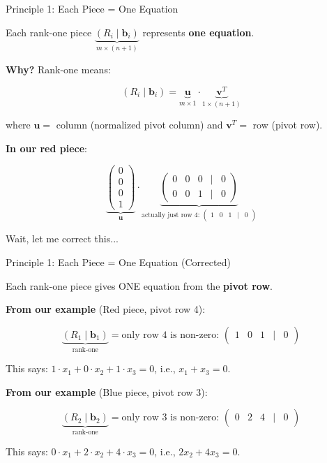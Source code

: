 \documentclass[10pt]{beamer}
\theoremstyle{definition}
\newcommand{\x}[1]{\alert{\textbf{#1}}}
\begin{document}
\begin{frame}{Principle 1: Each Piece = One Equation}

Each rank-one piece $\underbrace{(R_i \mid \mathbf{b}_i)}_{m \times (n+1)}$ represents \x{one equation}.

\vspace{1em}

\x{Why?} Rank-one means:

$$(R_i \mid \mathbf{b}_i) = \underbrace{\mathbf{u}}_{m \times 1} \cdot \underbrace{\mathbf{v}^T}_{1 \times (n+1)}$$

where $\mathbf{u} =$ column (normalized pivot column) and $\mathbf{v}^T =$ row (pivot row).

\vspace{1em}

\x{In our red piece}:

$$\underbrace{\begin{pmatrix} 0\\0\\0\\1 \end{pmatrix}}_{\mathbf{u}} \cdot \underbrace{\begin{pmatrix} 0 & 0 & 0 & \mid & 0 \\ 0 & 0 & 1 & \mid & 0 \end{pmatrix}}_{\text{actually just row 4: } \begin{pmatrix} 1 & 0 & 1 & \mid & 0 \end{pmatrix}}$$

Wait, let me correct this...

\end{frame}

\begin{frame}{Principle 1: Each Piece = One Equation (Corrected)}

Each rank-one piece gives ONE equation from the \textbf{pivot row}.

\vspace{1em}

\x{From our example} (Red piece, pivot row 4):

$$\underbrace{(R_1 \mid \mathbf{b}_1)}_{\text{rank-one}} = \text{only row 4 is non-zero: } \begin{pmatrix} 1 & 0 & 1 & \mid & 0 \end{pmatrix}$$

This says: $1 \cdot x_1 + 0 \cdot x_2 + 1 \cdot x_3 = 0$, i.e., $\boxed{x_1 + x_3 = 0}$.

\vspace{1em}

\x{From our example} (Blue piece, pivot row 3):

$$\underbrace{(R_2 \mid \mathbf{b}_2)}_{\text{rank-one}} = \text{only row 3 is non-zero: } \begin{pmatrix} 0 & 2 & 4 & \mid & 0 \end{pmatrix}$$

This says: $0 \cdot x_1 + 2 \cdot x_2 + 4 \cdot x_3 = 0$, i.e., $\boxed{2x_2 + 4x_3 = 0}$.

\end{frame}
\end{document}
